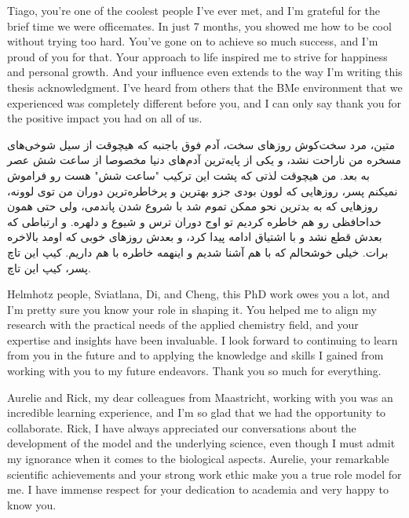 Tiago, you're one of the coolest people I've ever met, and I'm grateful for the brief time we were officemates. In just 7 months, you showed me how to be cool without trying too hard. You've gone on to achieve so much success, and I'm proud of you for that. Your approach to life inspired me to strive for happiness and personal growth. And your influence even extends to the way I'm writing this thesis acknowledgment. I've heard from others that the BMe environment that we experienced was completely different before you, and I can only say thank you for the positive impact you had on all of us.

\begin{flushright}
\foreignlanguage{persian}
{
متین، مرد سخت‌کوش روزهای سخت، آدم فوق باجنبه که هیچوقت از سیل شوخی‌های مسخره من ناراحت نشد، و یکی از پایه‌ترین آدم‌های دنیا مخصوصا از ساعت شش عصر به بعد. من هیچوقت لذتی که پشت این ترکیب "ساعت شش" هست رو فراموش نمیکنم پسر، روزهایی که لوون بودی جزو بهترین و پرخاطره‌ترین دوران من توی لوونه، روزهایی که به بدترین نحو ممکن تموم شد با شروع شدن پاندمی، ولی حتی همون خداحافظی رو هم خاطره کردیم تو اوج دوران ترس و شیوع و دلهره. و ارتباطی که بعدش قطع نشد و با اشتیاق ادامه پیدا کرد، و بعدش روزهای خوبی که اومد بالاخره برات. خیلی خوشحالم که با هم آشنا شدیم و اینهمه خاطره با هم داریم. کیپ این تاچ پسر، کیپ این تاچ.
}
\end{flushright}

\newpage

Helmhotz people, Sviatlana, Di, and Cheng, this PhD work owes you a lot, and I'm pretty sure you know your role in shaping it. You helped me to align my research with the practical needs of the applied chemistry field, and your expertise and insights have been invaluable. I look forward to continuing to learn from you in the future and to applying the knowledge and skills I gained from working with you to my future endeavors. Thank you so much for everything.

Aurelie and Rick, my dear colleagues from Maastricht, working with you was an incredible learning experience, and I'm so glad that we had the opportunity to collaborate. Rick, I have always appreciated our conversations about the development of the model and the underlying science, even though I must admit my ignorance when it comes to the biological aspects. Aurelie, your remarkable scientific achievements and your strong work ethic make you a true role model for me. I have immense respect for your dedication to academia and very happy to know you.


